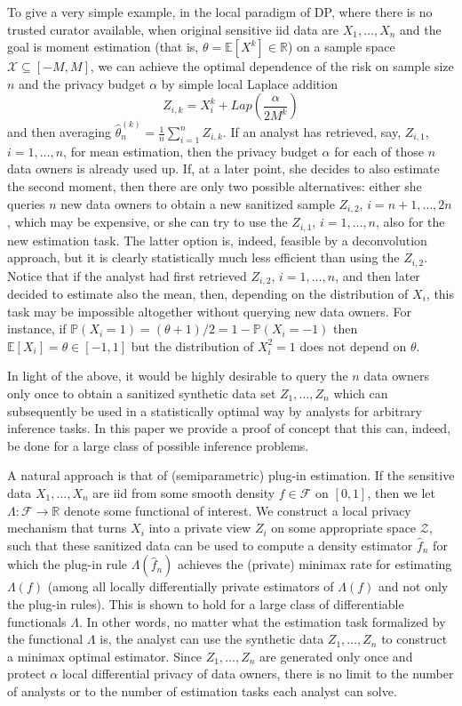 \documentclass[preprint]{imsart}
\newcommand{\R}{{\mathbb R}}
\newcommand{\E}{{\mathbb E}}
\renewcommand{\P}{\mathbb{P}}
\numberwithin{equation}{section}
\newcounter{cond}
\begin{document}
To give a very simple example, in the local paradigm of DP, where there is no trusted curator available, when original sensitive iid data are $X_1,\dots, X_n$ and the goal is moment estimation (that is, $\theta = \E[X^k]\in\R$) on a sample space $\mathcal X\subseteq[-M,M]$, we can achieve the optimal dependence of the risk on sample size $n$ and the privacy budget $\alpha$ by simple local Laplace addition
$$
Z_{i,k} = X_i^k + Lap\left(\frac{\alpha}{2M^k}\right)
$$
and then averaging $\hat{\theta}_n^{(k)} = \frac1n\sum_{i=1}^n Z_{i,k}$.
If an analyst has retrieved, say, $Z_{i,1}$, $i=1,\dots, n$, for mean estimation, then the privacy budget $\alpha$ for each of those $n$ data owners is already used up. If, at a later point, she decides to also estimate the second moment, then there are only two possible alternatives: either she queries $n$ new data owners to obtain a new sanitized sample $Z_{i,2}$, $i=n+1,\dots, 2n$, which may be expensive, or she can try to use the $Z_{i,1}$, $i=1,\dots,n$, also for the new estimation task. The latter option is, indeed, feasible by a deconvolution approach, but it is clearly statistically much less efficient than using the $Z_{i,2}$. Notice that if the analyst had first retrieved $Z_{i,2}$, $i=1,\dots, n$, and then later decided to estimate also the mean, then, depending on the distribution of $X_i$, this task may be impossible altogether without querying new data owners. For instance, if $\P(X_i=1)=(\theta+1)/2=1-\P(X_i=-1)$ then $\E[X_i] = \theta\in[-1,1]$ but the distribution of $X_i^2 = 1$ does not depend on $\theta$.

In light of the above, it would be highly desirable to query the $n$ data owners only once to obtain a sanitized synthetic data set $Z_1, \dots, Z_n$ which can subsequently be used in a statistically optimal way by analysts for arbitrary inference tasks. In this paper we provide a proof of concept that this can, indeed, be done for a large class of possible inference problems.

A natural approach is that of (semiparametric) plug-in estimation. If the sensitive data $X_1, \dots, X_n$ are iid from some smooth density $f\in\mathcal F$ on $[0,1]$, then we let $\Lambda:\mathcal F \to\R$ denote some functional of interest. We construct a local privacy mechanism that turns $X_i$ into a private view $Z_i$ on some appropriate space $\mathcal Z$, such that these sanitized data can be used to compute a density estimator $\hat{f}_n$ for which the plug-in rule $\Lambda(\hat{f}_n)$ achieves the (private) minimax rate for estimating $\Lambda(f)$ (among all locally differentially private estimators of $\Lambda(f)$ and not only the plug-in rules). This is shown to hold for a large class of differentiable functionals $\Lambda$. In other words, no matter what the estimation task formalized by the functional $\Lambda$ is, the analyst can use the synthetic data $Z_1,\dots, Z_n$ to construct a minimax optimal estimator. Since $Z_1, \dots, Z_n$ are generated only once and protect $\alpha$ local differential privacy of data owners, there is no limit to the number of analysts or to the number of estimation tasks each analyst can solve. 
\end{document}
